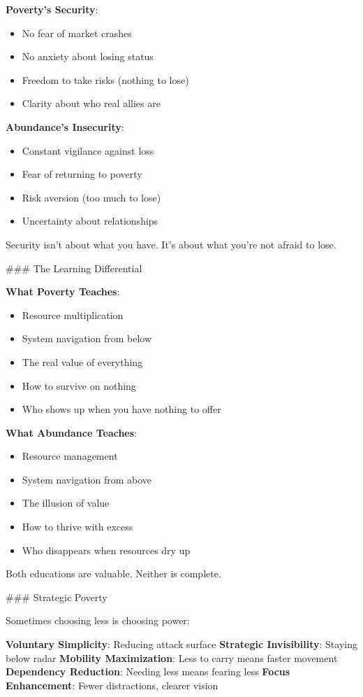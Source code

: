 \documentclass[12pt]{book}
\begin{document}
\textbf{Poverty's Security}: 
\begin{itemize}
\item No fear of market crashes
\item No anxiety about losing status
\item Freedom to take risks (nothing to lose)
\item Clarity about who real allies are

\end{itemize}
\textbf{Abundance's Insecurity}:
\begin{itemize}
\item Constant vigilance against loss
\item Fear of returning to poverty
\item Risk aversion (too much to lose)
\item Uncertainty about relationships

\end{itemize}
Security isn't about what you have. It's about what you're not afraid to lose.

\#\#\# The Learning Differential

\textbf{What Poverty Teaches}:
\begin{itemize}
\item Resource multiplication
\item System navigation from below
\item The real value of everything
\item How to survive on nothing
\item Who shows up when you have nothing to offer

\end{itemize}
\textbf{What Abundance Teaches}:
\begin{itemize}
\item Resource management
\item System navigation from above
\item The illusion of value
\item How to thrive with excess
\item Who disappears when resources dry up

\end{itemize}
Both educations are valuable. Neither is complete.

\#\#\# Strategic Poverty

Sometimes choosing less is choosing power:

\textbf{Voluntary Simplicity}: Reducing attack surface
\textbf{Strategic Invisibility}: Staying below radar
\textbf{Mobility Maximization}: Less to carry means faster movement
\textbf{Dependency Reduction}: Needing less means fearing less
\textbf{Focus Enhancement}: Fewer distractions, clearer vision
\end{document}
